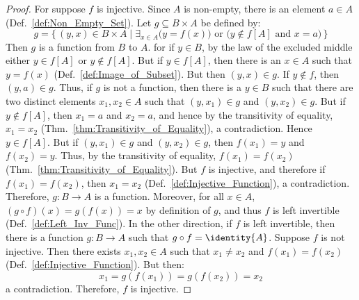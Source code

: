         \begin{proof}
            For suppose $f$ is injective. Since $A$ is non-empty, there is an
            element $a\in{A}$ (Def.~\ref{def:Non_Empty_Set}). Let
            $g\subseteq{B}\times{A}$ be defined by:
            \begin{equation}
                g=\{\,(y,x)\in{B}\times{A}\;|\;\exists_{x\in{A}}
                    \big(y=f(x)\big)\textrm{ or }
                    \big(y\notin{f}[A]\textrm{ and }x=a\big)\,\}
            \end{equation}
            Then $g$ is a function from $B$ to $A$. for if $y\in{B}$, by the law
            of the excluded middle either $y\in{f}[A]$ or $y\notin{f}[A]$. But
            if $y\in{f}[A]$, then there is an $x\in{A}$ such that $y=f(x)$
            (Def.~\ref{def:Image_of_Subset}). But then $(y,x)\in{g}$.
            If $y\notin{f}$, then $(y,a)\in{g}$. Thus, if $g$ is not a function,
            then there is a $y\in{B}$ such that there are two distinct elements
            $x_{1},x_{2}\in{A}$ such that $(y,x_{1})\in{g}$ and
            $(y,x_{2})\in{g}$. But if $y\notin{f}[A]$, then $x_{1}=a$ and
            $x_{2}=a$, and hence by the transitivity of equality, $x_{1}=x_{2}$
            (Thm.~\ref{thm:Transitivity_of_Equality}), a contradiction.
            Hence $y\in{f}[A]$. But if $(y,x_{1})\in{g}$ and
            $(y,x_{2})\in{g}$, then $f(x_{1})=y$ and $f(x_{2})=y$. Thus, by the
            transitivity of equality, $f(x_{1})=f(x_{2})$
            (Thm.~\ref{thm:Transitivity_of_Equality}). But $f$ is injective, and
            therefore if $f(x_{1})=f(x_{2})$, then $x_{1}=x_{2}$
            (Def.~\ref{def:Injective_Function}), a contradiction. Therefore,
            $g:B\rightarrow{A}$ is a function. Moreover, for all
            $x\in{A}$, $(g\circ{f})(x)=g(f(x))=x$ by definition of $g$, and
            thus $f$ is left invertible (Def.~\ref{def:Left_Inv_Func}). In the
            other direction, if $f$ is left invertible, then there is a function
            $g:B\rightarrow{A}$ such that $g\circ{f}=\identity{A}$. Suppose $f$
            is not injective. Then there exists $x_{1},x_{2}\in{A}$ such that
            $x_{1}\ne{x}_{2}$ and $f(x_{1})=f(x_{2})$
            (Def.~\ref{def:Injective_Function}). But then:
            \begin{equation}
                x_{1}=g(f(x_{1}))=g(f(x_{2}))=x_{2}
            \end{equation}
            a contradiction. Therefore, $f$ is injective.
        \end{proof}
